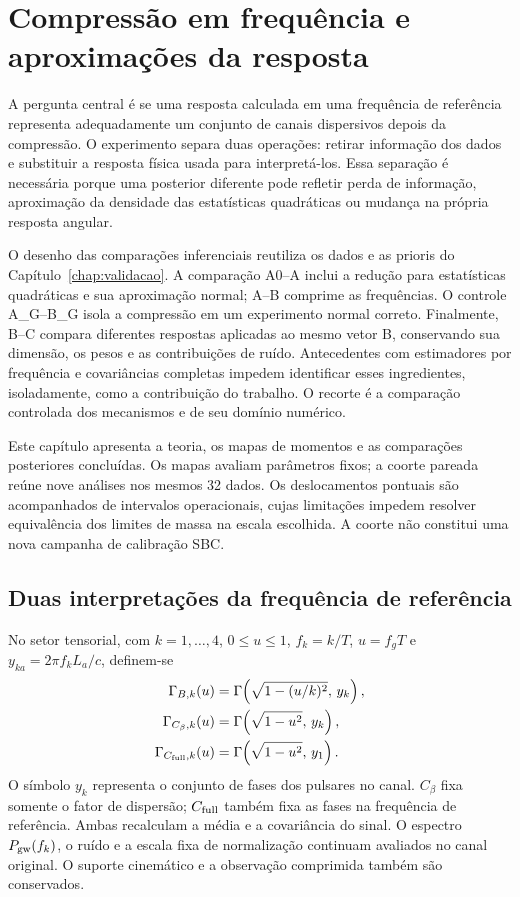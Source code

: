 \chapter[Resultados da compressão]{Compressão em frequência e aproximações da resposta}
\label{chap:compressao}

A pergunta central é se uma resposta calculada em uma frequência de referência
representa adequadamente um conjunto de canais dispersivos depois da compressão.
O experimento separa duas operações: retirar informação dos dados e substituir
a resposta física usada para interpretá-los. Essa separação é necessária porque
uma posterior diferente pode refletir perda de informação, aproximação da
densidade das estatísticas quadráticas ou mudança na própria resposta angular.

O desenho das comparações inferenciais reutiliza os dados e as prioris do
Capítulo~\ref{chap:validacao}. A comparação A0--A inclui a redução para
estatísticas quadráticas e sua aproximação normal; A--B comprime as frequências.
O controle A\_G--B\_G isola a compressão em um experimento normal correto.
Finalmente, B--C compara diferentes respostas aplicadas ao mesmo vetor B,
conservando sua dimensão, os pesos e as contribuições de ruído.
Antecedentes com estimadores por frequência e covariâncias completas
\cite{gersbach2025pfos,gersbach2026anisotropic,han2026} impedem identificar
esses ingredientes, isoladamente, como a contribuição do trabalho.
O recorte é a comparação controlada dos mecanismos e de seu domínio numérico.

Este capítulo apresenta a teoria, os mapas de momentos e as comparações
posteriores concluídas. Os mapas avaliam parâmetros fixos; a coorte
pareada reúne nove análises nos mesmos 32 dados. Os deslocamentos pontuais
são acompanhados de intervalos operacionais, cujas limitações impedem
resolver equivalência dos limites de massa na escala escolhida. A coorte
não constitui uma nova campanha de calibração SBC.

\section{Duas interpretações da frequência de referência}

No setor tensorial, com \(k=1,\ldots,4\), \(0\leq u\leq1\), \(f_k=k/T\), \(u=f_gT\) e \(y_{ka}=2\pi f_kL_a/c\), definem-se
\begin{align}
 \Gamma_{B,k}(u)&=\Gamma\!\left(\sqrt{1-(u/k)^2},\,y_k\right),\nonumber\\
 \Gamma_{C_\beta,k}(u)&=\Gamma\!\left(\sqrt{1-u^2},\,y_k\right),\nonumber\\
 \Gamma_{C_{\rm full},k}(u)&=\Gamma\!\left(\sqrt{1-u^2},\,y_1\right).
 \label{eq:comp-respostas}
\end{align}
O símbolo \(y_k\) representa o conjunto de fases dos pulsares no canal.
\(C_\beta\) fixa somente o fator de dispersão; \(C_{\rm full}\) também
fixa as fases na frequência de referência. Ambas recalculam a média e a
covariância do sinal. O espectro \(P_{\rm gw}(f_k)\), o ruído e a escala
fixa de normalização continuam avaliados no canal original. O suporte
cinemático e a observação comprimida também são conservados.

